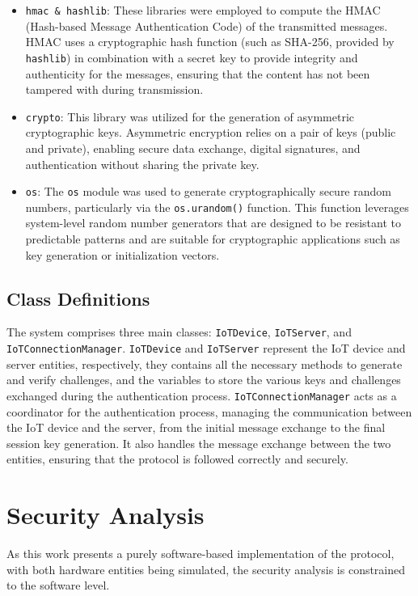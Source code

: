 \documentclass[10pt,twocolumn,letterpaper]{article}
\begin{document}
\begin{itemize}
    \item \texttt{hmac \& hashlib}: These libraries were employed to compute the HMAC (Hash-based Message Authentication Code) of the transmitted messages.
          HMAC uses a cryptographic hash function (such as SHA-256, provided by \texttt{hashlib}) in combination with a secret key to provide integrity and authenticity for the messages,
          ensuring that the content has not been tampered with during transmission.
    \item \texttt{crypto}: This library was utilized for the generation of asymmetric cryptographic keys.
          Asymmetric encryption relies on a pair of keys (public and private), enabling secure data exchange, digital signatures, and authentication without sharing the private key.
    \item \texttt{os}: The \texttt{os} module was used to generate cryptographically secure random numbers, particularly via the \texttt{os.urandom()} function.
          This function leverages system-level random number generators that are designed to be resistant to predictable patterns and are suitable for cryptographic applications such as key generation or initialization vectors.
\end{itemize}

\subsection{Class Definitions}
The system comprises three main classes: \texttt{IoTDevice}, \texttt{IoTServer}, and \texttt{IoTConnectionManager}.
\texttt{IoTDevice} and \texttt{IoTServer} represent the IoT device and server entities, respectively, they contains all the necessary methods to generate and verify challenges, 
and the variables to store the various keys and challenges exchanged during the authentication process.
\texttt{IoTConnectionManager} acts as a coordinator for the authentication process, managing the communication between the IoT device and the server, from the initial message exchange to the final session key generation.
It also handles the message exchange between the two entities, ensuring that the protocol is followed correctly and securely.

\section{Security Analysis}
As this work presents a purely software-based implementation of the protocol, with both hardware entities being simulated, the security analysis is constrained to the software level. 
\end{document}

